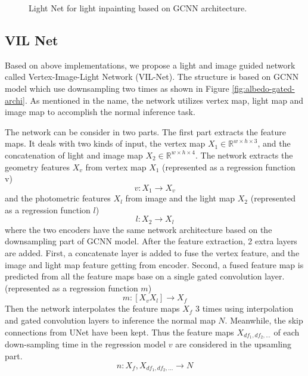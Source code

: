 \documentclass[border=15pt, multi, tikz]{article}
\begin{document}
\begin{figure}[th]
	\caption{Light Net for light inpainting based on GCNN architecture.}
	\label{fig:light-net-archi}
\end{figure}

	
	

\subsection{VIL Net}
Based on above implementations, we propose a light and image guided network called Vertex-Image-Light Network (VIL-Net). 
The structure is based on GCNN model which use downsampling two times as shown in Figure \ref{fig:albedo-gated-archi}. As mentioned in the name, the network utilizes vertex map, light map and image map to accomplish the normal inference task. 

The network can be consider in two parts. The first part extracts the feature maps. It deals with two kinds of input, the vertex map $ X_1 \in \mathbb{R}^{w\times h\times3}$, and the concatenation of light and image map $ X_2 \in \mathbb{R}^{w\times h\times4} $. The network extracts the geometry features $ X_v $ from vertex map $ X_1 $ (represented as a regression function v)
\[ v: X_1 \rightarrow X_v \]
and the photometric features $ X_l $ from image and the light map $ X_2 $ (represented as a regression function $ l $)
\[ l: X_2 \rightarrow X_l \]
where the two encoders have the same network architecture based on the downsampling part of GCNN model. After the feature extraction, 2 extra layers are added. First, a concatenate layer is added to fuse the vertex feature, and the image and light map feature getting from encoder. 
Second, a fused feature map is predicted from all the feature maps base on a single gated convolution layer. (represented as a regression function $ m $)
\[ m: [X_v X_l] \rightarrow X_f \]
Then the network interpolates the feature maps $ X_f $ 3 times using interpolation and gated convolution layers to inference the normal map $ N $. Meanwhile, the skip connections from UNet have been kept. Thus the feature maps $ X_{df_1, df_2, ...} $ of each down-sampling time in the regression model $ v $ are considered in the upsamling part.
\[ n: X_f, X_{df_1, df_2, ...} \rightarrow N \]
\end{document}
